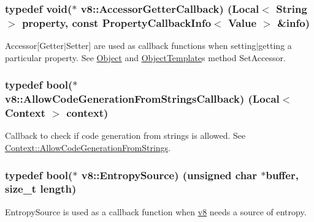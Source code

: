\subsubsection[{\texorpdfstring{Accessor\+Getter\+Callback}{AccessorGetterCallback}}]{\setlength{\rightskip}{0pt plus 5cm}typedef void($\ast$ v8\+::\+Accessor\+Getter\+Callback) ({\bf Local}$<$ {\bf String} $>$ property, const {\bf Property\+Callback\+Info}$<$ {\bf Value} $>$ \&info)}\hypertarget{namespacev8_a722613c87061708a4f1aa050d095f868}{}\label{namespacev8_a722613c87061708a4f1aa050d095f868}
Accessor\mbox{[}Getter$\vert$\+Setter\mbox{]} are used as callback functions when setting$\vert$getting a particular property. See \hyperlink{classv8_1_1_object}{Object} and \hyperlink{classv8_1_1_object_template}{Object\+Template}\textquotesingle{}s method Set\+Accessor. 
\subsubsection[{\texorpdfstring{Allow\+Code\+Generation\+From\+Strings\+Callback}{AllowCodeGenerationFromStringsCallback}}]{\setlength{\rightskip}{0pt plus 5cm}typedef bool($\ast$ v8\+::\+Allow\+Code\+Generation\+From\+Strings\+Callback) ({\bf Local}$<$ {\bf Context} $>$ context)}\hypertarget{namespacev8_a521d909ec201742a1cb35d50a8e2a3c2}{}\label{namespacev8_a521d909ec201742a1cb35d50a8e2a3c2}
Callback to check if code generation from strings is allowed. See \hyperlink{classv8_1_1_context_a794ccc42113566f5d363f89c8b0d3c2c}{Context\+::\+Allow\+Code\+Generation\+From\+Strings}. 
\subsubsection[{\texorpdfstring{Entropy\+Source}{EntropySource}}]{\setlength{\rightskip}{0pt plus 5cm}typedef bool($\ast$ v8\+::\+Entropy\+Source) (unsigned char $\ast$buffer, size\+\_\+t length)}\hypertarget{namespacev8_ab699f4bbbb56350e6e915682e420fcdc}{}\label{namespacev8_ab699f4bbbb56350e6e915682e420fcdc}
Entropy\+Source is used as a callback function when \hyperlink{namespacev8}{v8} needs a source of entropy. 
